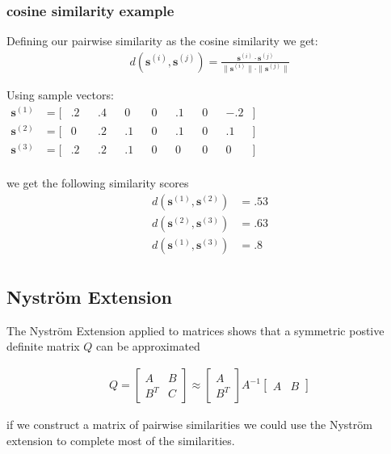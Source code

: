 \documentclass{article} %
\newcommand{\st}[1]{\textbf{s}^{(#1)}}
\newcommand{\pairsim}[1]{d(#1)}
\begin{document}
\subsubsection{cosine similarity example} \label{cosine}
Defining our pairwise similarity as the cosine similarity we get:
\begin{eqnarray}
	\pairsim{\st{i},\st{j}} = \frac{  \st{i} \cdot \st{j}  } {  \|\st{i} \| \cdot \|\st{j}\|  }
\end{eqnarray}

Using sample vectors:
\begin{align*}
\st{1} &= [&.2&	&.4& 	&0&	&0&	&.1& 	&0& &-.2& ]&&&&&&&&&&&&&&&&&&\\
\st{2} &= [&0&	&.2&	&.1&	&0&	&.1& 	&0& &.1& ] &&&&&&&&&&&&&&&&&&\\
\st{3} &= [&.2&	&.2& 	&.1&	&0&	&0&	&0&   &0& ]&&&&&&&&&&&&&&&&&&\\
\end{align*}

we get the following similarity scores 
\begin{eqnarray*}
\pairsim{\st{1},\st{2}} &= .53\\
\pairsim{\st{2},\st{3}} &= .63\\
\pairsim{\st{1},\st{3}} &= .8\\
\end{eqnarray*}

\subsection{Nystr\"om Extension}
The Nystr\"om Extension applied to matrices \cite{fowlkes2004spectral} shows that a symmetric postive definite matrix $Q$ can be approximated

\begin{eqnarray}
	Q = 
	\begin{bmatrix}
	   A      & B \\
	   B^T & C 
	\end{bmatrix}
	\approx
	\begin{bmatrix}
	    A   \\
	   B^T 
	\end{bmatrix}
	A^{-1}
	\begin{bmatrix}
	    A   &  B 
	\end{bmatrix}
\end{eqnarray}

if we construct a matrix of pairwise similarities we could use the Nystr\"om extension to complete most of the similarities. 
\end{document}
